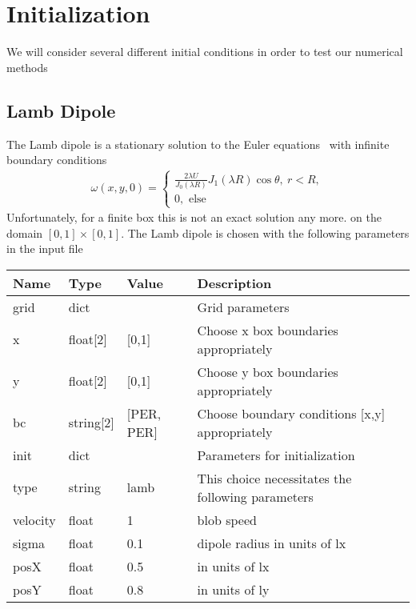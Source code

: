 \section{Initialization}
We will consider several different initial conditions in order to test
our numerical methods
\subsection{Lamb Dipole}
The Lamb dipole is a stationary solution to the Euler equations~\cite{Nielsen1997} with infinite
boundary conditions
\begin{align}
    \omega(x,y,0) = \begin{cases}
        \frac{2\lambda U}{J_0(\lambda R)} J_1(\lambda R) \cos \theta,\ r < R,\\
        0, \text{ else}
    \end{cases}
\end{align}
Unfortunately, for a finite box this is not an exact solution any more.
on the domain $[0,1]\times [0,1]$.
The Lamb dipole is chosen with the following parameters in the input file
\begin{longtable}{llll}
\toprule
\rowcolor{gray!50}\textbf{Name} &  \textbf{Type} & \textbf{Value}  & \textbf{Description}  \\ \midrule
grid & dict &  & Grid parameters \\
\qquad x & float[2]& [0,1] & Choose x box boundaries appropriately \\
\qquad y & float[2]& [0,1] & Choose y box boundaries appropriately \\
\qquad bc & string[2] & [PER, PER] & Choose boundary conditions [x,y] appropriately \\
init &  dict &   & Parameters for initialization \\
\qquad type      & string & lamb & This choice necessitates the following parameters \\
\qquad velocity  & float &  1    &  blob speed \\
\qquad sigma     & float &  0.1  & dipole radius in units of lx \\
\qquad posX      & float &  0.5  & in units of lx \\
\qquad posY      & float &  0.8  & in units of ly \\
\bottomrule
\end{longtable}
